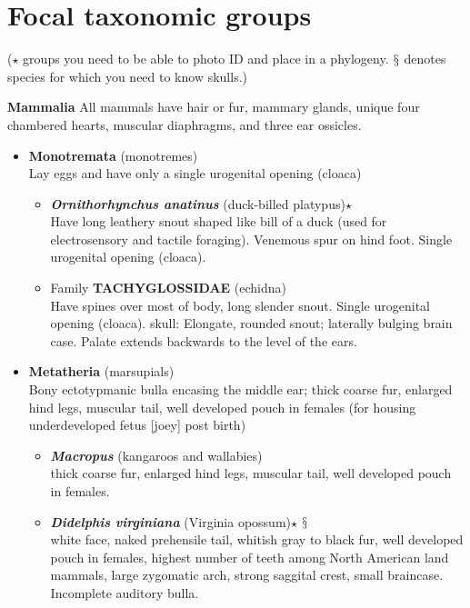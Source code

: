 \documentclass[a4paper,12pt]{article}
\begin{document}
\section*{Focal taxonomic groups} ($\star$ groups you need to be able to photo ID and place in a phylogeny. $\mathsection$ denotes species for which you need to know skulls.)
\begin{description}
\item\textbf{Mammalia}
All mammals have hair or fur, mammary glands, unique four chambered hearts, muscular diaphragms, and three ear ossicles.

\begin{itemize}
  \item{\textbf{Monotremata} (monotremes)} \\ Lay eggs and have only a single urogenital opening (cloaca)
  \begin{itemize}
    \item{\textbf{\textit{Ornithorhynchus anatinus}} (duck-billed platypus)$\star$} \\ Have long leathery snout shaped like bill of a duck (used for electrosensory and tactile foraging). Venemous spur on hind foot. Single urogenital opening  (cloaca).
    \item Family {\textbf{TACHYGLOSSIDAE} (echidna)} \\ Have spines over most of body, long slender snout. Single urogenital opening (cloaca). skull: Elongate, rounded snout; laterally bulging brain case. Palate extends backwards to the level of the ears.
  \end{itemize}
  \item{\textbf{Metatheria} (marsupials)} \\ Bony ectotypmanic bulla encasing the middle ear; thick coarse fur, enlarged hind legs, muscular tail, well developed pouch in females (for housing underdeveloped fetus [joey] post birth)
  \begin{itemize}
    \item{\textbf{\textit{Macropus}} (kangaroos and wallabies)} \\ thick coarse fur, enlarged hind legs, muscular tail, well developed pouch in females.
    \item{\textbf{\textit{Didelphis virginiana}} (Virginia opossum)$\star$ $\mathsection$} \\ white face, naked prehensile tail, whitish gray to black fur, well developed pouch in females, highest number of teeth among North American land mammals, large zygomatic arch, strong saggital crest, small braincase. Incomplete auditory bulla. 

\end{itemize}
\end{itemize}
\end{description}
\end{document}
